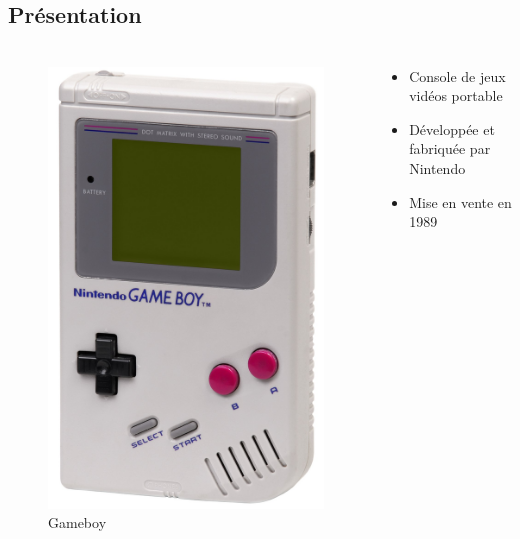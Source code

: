 \documentclass{beamer}
\begin{document}
\subsection{Présentation}
\begin{frame}
	\frametitle{\secname}
  \framesubtitle{\subsecname}
  \begin{columns}[T]
		\begin{column}{.30\textwidth}
			\begin{figure}
				\includegraphics[width=.6\textwidth]{images/gameboy.jpg}
				\caption{Gameboy}
			\end{figure}
		\end{column}
		\begin{column}{.70\textwidth}
			\begin{itemize}
				\item Console de jeux vidéos portable
        \item Développée et fabriquée par Nintendo
				\item Mise en vente en 1989
      \end{itemize}
		\end{column}
	\end{columns}
\end{frame}

\end{document}
